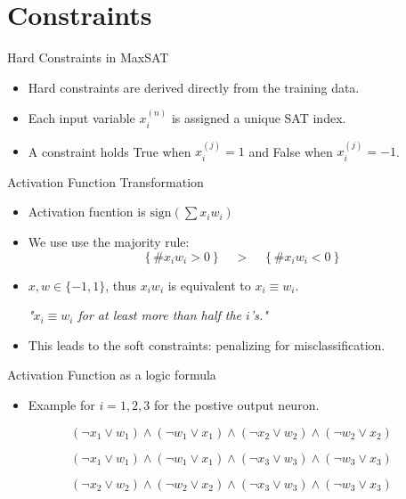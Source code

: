 \documentclass[12pt]{beamer}
\begin{document}
\section{Constraints}

\begin{frame}{Hard Constraints in MaxSAT}
\begin{itemize}
    \item Hard constraints are derived directly from the training data.
    \item Each input variable \( x_i^{(n)} \) is assigned a unique SAT index.
    \item A constraint holds True when \( x_i^{(j)} = 1 \) and False when \( x_i^{(j)} = -1 \).
\end{itemize}
\end{frame}

\begin{frame}{Activation Function Transformation}
\begin{itemize}
    \item Activation fucntion is $\text{sign}\left(\sum x_i w_i\right)$
    \item We use use the majority rule:
    \[ \left\{ \# x_i w_i > 0 \right\} \quad >  \quad \left\{ \# x_i w_i < 0 \right\} \] 
    \item $x, w \in \{-1,1\}$, thus $x_i w_i$ is equivalent to $x_i \equiv w_i$.

    \vspace{0.4cm}
    
    \textit{"\( x_i \equiv w_i \) for at least more than half the \( i \)'s."}

    \item This leads to the soft constraints: penalizing for misclassification.
    
\end{itemize}
\end{frame}

\begin{frame}{Activation Function as a logic formula}
\begin{itemize}
    \item Example for \( i = 1,2,3 \) for the postive output neuron.
\end{itemize}
\vspace{-0.6cm}

\centering

\[
(\neg x_1 \vee w_1)  \wedge (\neg w_1 \vee x_1) \wedge
(\neg x_2 \vee w_2)  \wedge (\neg w_2 \vee x_2)
\]

\vee

\[
(\neg x_1 \vee w_1)  \wedge (\neg w_1 \vee x_1) \wedge
(\neg x_3 \vee w_3)  \wedge (\neg w_3 \vee x_3)
\]

\vee

\[
(\neg x_2 \vee w_2)  \wedge (\neg w_2 \vee x_2) \wedge
(\neg x_3 \vee w_3)  \wedge (\neg w_3 \vee x_3)
\]

\end{frame}
\end{document}
